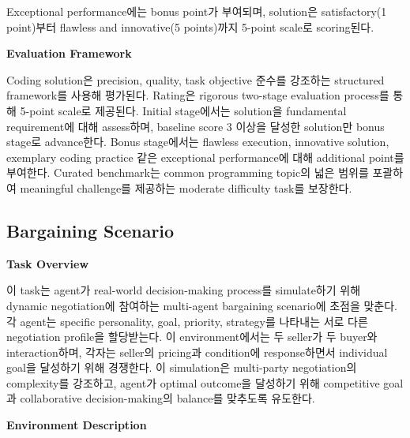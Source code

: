 Exceptional performance에는 bonus point가 부여되며, solution은 satisfactory(1 point)부터 flawless and innovative(5 points)까지 5-point scale로 scoring된다.

\textbf{Evaluation Framework}

Coding solution은 precision, quality, task objective 준수를 강조하는 structured framework를 사용해 평가된다. Rating은 rigorous two-stage evaluation process를 통해 5-point scale로 제공된다. Initial stage에서는 solution을 fundamental requirement에 대해 assess하며, baseline score 3 이상을 달성한 solution만 bonus stage로 advance한다. Bonus stage에서는 flawless execution, innovative solution, exemplary coding practice 같은 exceptional performance에 대해 additional point를 부여한다. Curated benchmark는 common programming topic의 넓은 범위를 포괄하여 meaningful challenge를 제공하는 moderate difficulty task를 보장한다.




\subsection{Bargaining Scenario}
\label{app:bargaining-scenario}
\textbf{Task Overview}

이 task는 agent가 real-world decision-making process를 simulate하기 위해 dynamic negotiation에 참여하는 multi-agent bargaining scenario에 초점을 맞춘다. 각 agent는 specific personality, goal, priority, strategy를 나타내는 서로 다른 negotiation profile을 할당받는다. 이 environment에서는 두 seller가 두 buyer와 interaction하며, 각자는 seller의 pricing과 condition에 response하면서 individual goal을 달성하기 위해 경쟁한다. 이 simulation은 multi-party negotiation의 complexity를 강조하고, agent가 optimal outcome을 달성하기 위해 competitive goal과 collaborative decision-making의 balance를 맞추도록 유도한다.

\textbf{Environment Description}

